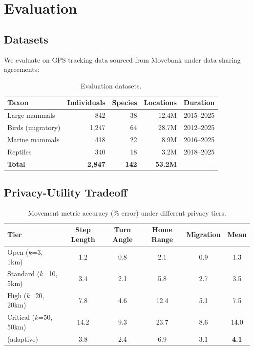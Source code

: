 \section{Evaluation}


\subsection{Datasets}

We evaluate on GPS tracking data sourced from Movebank under data sharing agreements:

\begin{table}[htbp]
\centering
\caption{Evaluation datasets.}
\label{tab:eval_datasets}
\begin{tabular}{lrrrr}
\toprule
\textbf{Taxon} & \textbf{Individuals} & \textbf{Species} & \textbf{Locations} & \textbf{Duration} \\
\midrule
Large mammals & 842 & 38 & 12.4M & 2015--2025 \\
Birds (migratory) & 1,247 & 64 & 28.7M & 2012--2025 \\
Marine mammals & 418 & 22 & 8.9M & 2016--2025 \\
Reptiles & 340 & 18 & 3.2M & 2018--2025 \\
\midrule
\textbf{Total} & \textbf{2,847} & \textbf{142} & \textbf{53.2M} & --- \\
\bottomrule
\end{tabular}
\end{table}

\subsection{Privacy-Utility Tradeoff}

\begin{table}[htbp]
\centering
\caption{Movement metric accuracy (\% error) under different privacy tiers.}
\label{tab:privacy_utility}
\begin{tabular}{lccccc}
\toprule
\textbf{Tier} & \textbf{Step Length} & \textbf{Turn Angle} & \textbf{Home Range} & \textbf{Migration} & \textbf{Mean} \\
\midrule
Open ($k$=3, 1km) & 1.2 & 0.8 & 2.1 & 0.9 & 1.3 \\
Standard ($k$=10, 5km) & 3.4 & 2.1 & 5.8 & 2.7 & 3.5 \\
High ($k$=20, 20km) & 7.8 & 4.6 & 12.4 & 5.1 & 7.5 \\
Critical ($k$=50, 50km) & 14.2 & 9.3 & 23.7 & 8.6 & 14.0 \\
\midrule
\WildTrack{} (adaptive) & 3.8 & 2.4 & 6.9 & 3.1 & \textbf{4.1} \\
\bottomrule
\end{tabular}
\end{table}

